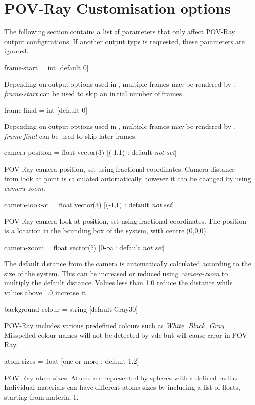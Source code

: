 \section*{POV-Ray Customisation options}

The following section contains a list of parameters that only affect POV-Ray output configurations. If another output type is requested, these parameters are ignored.

{\zicf frame-start = int [default 0]} Depending on output options used in \vampire, multiple frames may be rendered by \vdc. \textit{frame-start} can be used to skip an initial number of frames.

{\zicf frame-final = int [default 0]} Depending on output options used in \vampire, multiple frames may be rendered by \vdc. \textit{frame-final} can be used to skip later frames.

{\zicf camera-position = float vector(3) [(-1,1) : default \textit{not set}]} POV-Ray camera position, set using fractional coordinates. Camera distance from look at point is calculated automatically however it can be changed by using \textit{camera-zoom}.

{\zicf camera-look-at = float vector(3) [(-1,1) : default \textit{not set}]} POV-Ray camera look at position, set using fractional coordinates. The position is a location in the bounding box of the system, with centre (0,0,0).

{\zicf camera-zoom = float vector(3) [0-$\infty$ : default \textit{not set}]} The default distance from the camera is automatically calculated according to the size of the system. This can be increased or reduced using \textit{camera-zoom} to multiply the default distance. Values less than 1.0 reduce the distance while values above 1.0 increase it.

{\zicf background-colour = string [default Gray30]} POV-Ray includes various predefined colours such as \textit{White, Black, Gray}. Misspelled colour names will not be detected by vdc but will cause error in POV-Ray.

{\zicf atom-sizes = float [one or more : default 1.2]} POV-Ray atom sizes. Atoms are represented by spheres with a defined radius. Individual materials can have different atoms sizes by including a list of floats, starting from material 1.

